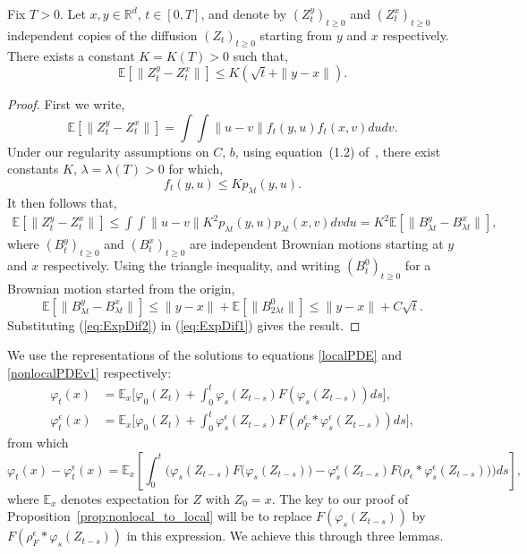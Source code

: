 \documentclass[EJP]{ejpecp} %
\newcommand{\IE}{\mathbb E}
\begin{document}
\begin{lemma} \label{regularityForX2}
Fix $T>0$. Let $x,y \in \mathbb{R}^d$, $t \in [0,T]$, and denote by 
$(Z_t^y)_{t\geq 0}$ and $(Z_t^x)_{t\geq 0}$ independent copies of the 
diffusion $(Z_t)_{t\geq 0}$ starting 
from $y$ and $x$ respectively. There exists a constant $K=K(T)>0$ such that, 
\[ \IE[\|Z_t^y-Z_t^x\|] \leq K(\sqrt{t} + \|y-x\|). \]
\end{lemma}
\begin{proof}
First we write, 
\[ \IE[\|Z_t^y-Z_t^x\|]  = \int \int \|u-v\| f_t(y,u) f_t(x,v) du dv . \]
Under our regularity assumptions on $C$, $b$, using equation~(1.2)
of~\cite{sheu:1991}, there exist constants $K$, $\lambda =\lambda (T)>0$ 
for which,
\[ f_t(y,u) \leq K  p_{\lambda  t}(y,u). \]
It then follows that,
\begin{align}
  \IE[\|Z_t^y-Z_t^x\|]  \leq \int \int \|u-v\| K^2 p_{\lambda  t}(y,u) 
p_{\lambda  t}(x,v) dv du = K^2 \IE[\|B_{\lambda  t}^y-B_{\lambda  t}^x\|], 
\label{eq:ExpDif1}
\end{align}
where $(B_t^y)_{t\geq 0}$ and $(B_t^x)_{t\geq 0}$ are 
independent Brownian motions starting at $y$ and $x$ respectively. 
Using the triangle inequality, and writing $(B^0_t)_{t\geq 0}$ for a 
Brownian motion started from the origin,
\begin{equation}
\IE[\|B_{\lambda  t}^y-B_{\lambda  t}^x\|]
	\leq \|y-x\|+\IE[\|B^0_{2\lambda t}\|] 
\leq \|y-x\|+C\sqrt{t}. \label{eq:ExpDif2}
\end{equation}
Substituting (\ref{eq:ExpDif2}) in (\ref{eq:ExpDif1}) gives the result.
\end{proof}

We use the representations of the solutions to equations \eqref{localPDE} and \eqref{nonlocalPDEv1} respectively:
\begin{align}
\varphi_t(x) &= \IE_x\Big[\varphi_0(Z_t) 
    + \int_0^t \varphi_s(Z_{t-s})F(\varphi_s(Z_{t-s})) ds\Big], \label{FK:varphi} \\
\varphi^\epsilon_t(x) &= \IE_x\Big[\varphi_0(Z_t) 
    + \int_0^t \varphi^\epsilon_s(Z_{t-s})F(\rho^\epsilon_F*\varphi^\epsilon_s(Z_{t-s})) ds\Big],
\end{align}
from which
\begin{equation} 
\varphi_t(x) - \varphi^\epsilon_t(x) = 
    \IE_x\left[ \int_0^t \Big(\varphi_s(Z_{t-s})F\big(\varphi_s(Z_{t-s})\big)
    -\varphi^\epsilon_s(Z_{t-s})F\big(\rho_\epsilon*\varphi^\epsilon_s(Z_{t-s})\big)\Big) ds \right] ,
\label{FK:diferencesVarphis}
\end{equation}
where $\IE_x$ denotes expectation for $Z$ with $Z_0 = x$.
The key to our proof of Proposition~\ref{prop:nonlocal_to_local}
will be to replace $F(\varphi_s(Z_{t-s}))$ by $F(\rho^\epsilon_F*\varphi_s(Z_{t-s}))$ 
in this expression. 
We achieve this through three lemmas.
\end{document}
